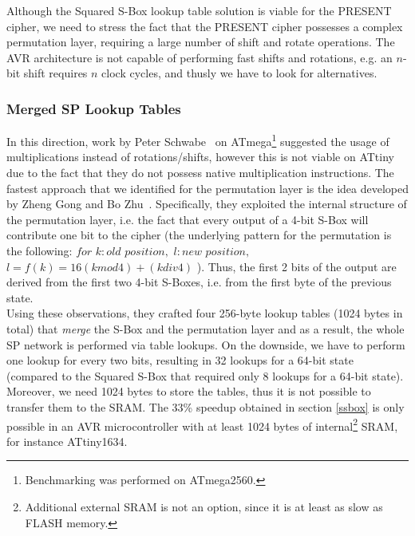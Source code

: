 \documentclass[11pt]{article}
\begin{document}
Although the Squared S-Box lookup table solution is viable for the PRESENT cipher, we need to stress the fact that the PRESENT cipher possesses a complex permutation layer, requiring a large number of shift and rotate operations. The AVR architecture is not capable of performing fast shifts and rotations,  e.g. an $n$-bit shift requires $n$ clock cycles, and thusly we have to look for alternatives.
\subsubsection{Merged SP Lookup Tables}\label{msbox}
In this direction, work by Peter Schwabe~\cite{nacl} on ATmega\footnote{Benchmarking was performed on ATmega2560.} suggested the usage of multiplications instead of rotations/shifts, however this is not viable on ATtiny due to the fact that they do not possess native multiplication instructions. The fastest approach that we identified for the permutation layer is the idea developed by Zheng Gong and Bo Zhu~\cite{gong_code, gong_paper}. Specifically, they exploited the internal structure of the permutation layer, i.e. the fact that every output of a 4-bit S-Box will contribute one bit to the cipher (the underlying pattern for the permutation is the following: $for$ $k:old$ $position,$ $l:new$ $position,$ $l=f(k)=16(k mod 4)+(k div 4)$ ). Thus, the first 2 bits of the output are derived from the first two 4-bit S-Boxes, i.e. from the first byte of the previous state. \\
Using these observations, they crafted four 256-byte lookup tables (1024 bytes in total) that \emph{merge} the S-Box and the permutation layer and as a result, the whole SP network is performed via table lookups. On the downside, we have to perform one lookup for every two bits, resulting in 32 lookups for a 64-bit state (compared to the Squared S-Box that required only 8 lookups for a 64-bit state). Moreover, we need 1024 bytes to store the tables, thus it is not possible to transfer them to the SRAM. The 33\% speedup obtained in section \ref{ssbox} is only possible in an AVR microcontroller with at least 1024 bytes of internal\footnote{Additional external SRAM is not an option, since it is at least as slow as FLASH memory.} SRAM, for instance ATtiny1634.
\end{document}
